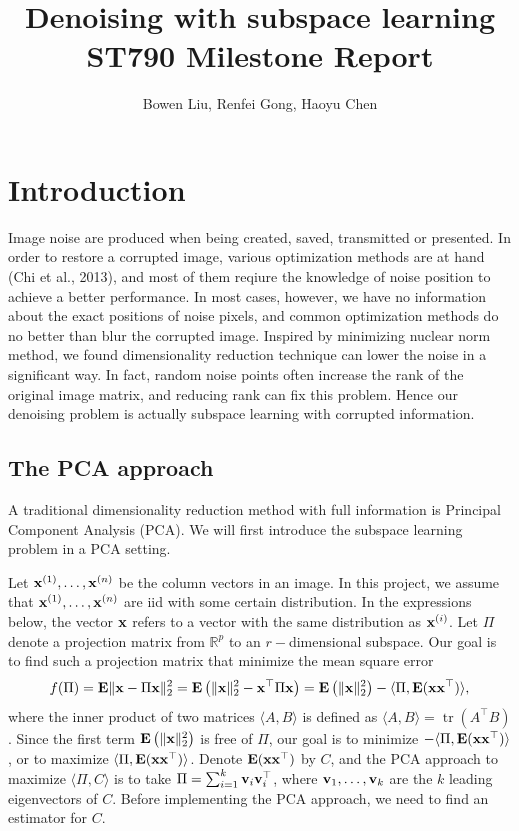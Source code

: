 \documentclass[12pt]{article}
\title{Denoising with subspace learning\\ST790 Milestone Report}
\author{Bowen Liu, Renfei Gong, Haoyu Chen}
\newcommand{\Real}{\mathbb{R}}
\newcommand{\Expect}{\mathbf{E}}
\newcommand{\Tra}{^{\top}}
\newcommand{\tr}{\operatorname{tr}}
\newcommand{\V}[1]{{\mathbf{\MakeLowercase{#1}}}}
\begin{document}
	
	\maketitle
	
	\section{Introduction}
	
	Image noise are produced when being created, saved, transmitted or presented. In order to restore a corrupted image, various optimization methods are at hand (Chi et al., 2013), and most of them reqiure the knowledge of noise position to achieve a better performance. In most cases, however, we have no information about the exact positions of noise pixels, and common optimization methods do no better than blur the corrupted image. Inspired by minimizing nuclear norm method, we found dimensionality reduction technique can lower the noise in a significant way. In fact, random noise points often increase the rank of the original image matrix, and reducing rank can fix this problem. Hence our denoising problem is actually subspace learning with corrupted information. 
	
	\subsection{The PCA approach}
	A traditional dimensionality reduction method with full information is Principal Component Analysis (PCA). We will first introduce the subspace learning problem in a PCA setting.
	
	Let $\V{x}^{(1)}, \ldots, \V{x}^{(n)}$ be the column vectors in an image. In this project, we assume that $\V{x}^{(1)}, \ldots, \V{x}^{(n)}$ are iid with some certain distribution. In the expressions below, the vector $\V{x}$ refers to a vector with the same distribution as $\V{x}^{(i)}$.
	Let $\Pi$ denote a projection matrix from $\Real^p$ to an $r-$dimensional subspace. Our goal is to find such a projection matrix that minimize the mean square error
	$$
	f(\Pi) = \Expect \|\V{x} - \Pi\V{x} \|_2^2 = \Expect \left( \|\V{x} \|_2^2 -\V{x}\Tra\Pi\V{x} \right)
	= \Expect \left( \|\V{x} \|_2^2 \right) - \langle \Pi, \Expect (\V{x}\V{x}\Tra)\rangle,
	$$
	where the inner product of two matrices $\langle A, B\rangle$ is defined as $\langle A, B\rangle = \tr(A\Tra B)$. Since the first term $\Expect \left( \|\V{x} \|_2^2 \right)$ is free of $\Pi$, our goal is to minimize $-\langle \Pi, \Expect (\V{x}\V{x}\Tra)\rangle$, or to maximize $\langle \Pi, \Expect (\V{x}\V{x}\Tra)\rangle$. Denote $\Expect (\V{x}\V{x}\Tra)$ by $C$, and the PCA approach to maximize $\langle \Pi, C\rangle$ is to take $\Pi = \sum_{i=1}^k \V{v}_i \V{v}_i\Tra$, where $\V{v}_1, \ldots, \V{v}_k$ are the $k$ leading eigenvectors of $C$. Before implementing the PCA approach, we need to find an estimator for $C$.
	
\end{document}
